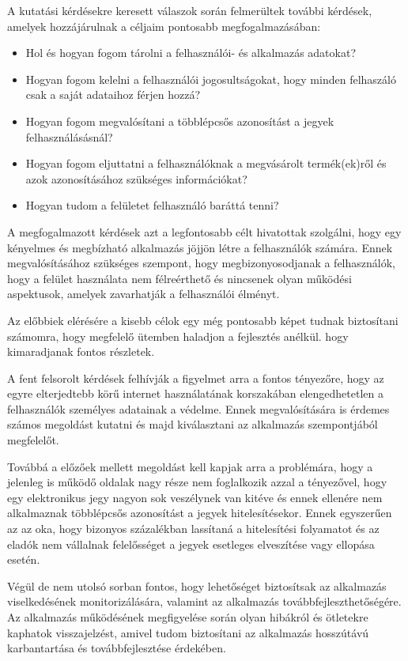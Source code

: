 A kutatási kérdésekre keresett válaszok során felmerültek további kérdések, amelyek hozzájárulnak a céljaim pontosabb megfogalmazásában:
\begin{itemize}
	\item Hol és hogyan fogom tárolni a felhasználói- és alkalmazás adatokat?
	\item Hogyan fogom kelelni a felhasználói jogosultságokat, hogy minden felhaszáló csak a saját adataihoz férjen hozzá?
	\item Hogyan fogom megvalósítani a többlépcsős azonosítást a jegyek felhasználásásnál?
	\item Hogyan fogom eljuttatni a felhasználóknak a megvásárolt termék(ek)ről és azok azonosításához szükséges információkat? 
	\item Hogyan tudom a felületet felhasználó baráttá tenni?
\end{itemize}

A megfogalmazott kérdések azt a legfontosabb célt hivatottak szolgálni, hogy egy kényelmes és megbízható alkalmazás jöjjön létre a felhasználók számára. Ennek megvalósításához szükséges szempont, hogy megbizonyosodjanak a felhasználók, hogy a felület használata nem félreérthető és nincsenek olyan működési aspektusok, amelyek zavarhatják a felhasználói élményt.

Az előbbiek elérésére a kisebb célok egy még pontosabb képet tudnak biztosítani számomra, hogy megfelelő ütemben haladjon a fejlesztés anélkül. hogy kimaradjanak fontos részletek.

A fent felsorolt kérdések felhívják a figyelmet arra a fontos tényezőre, hogy az egyre elterjedtebb körű internet használatának korszakában elengedhetetlen a felhasználók személyes adatainak a védelme. Ennek megvalósítására is érdemes számos megoldást kutatni és majd kiválasztani az alkalmazás szempontjából megfelelőt.

Továbbá a előzőek mellett megoldást kell kapjak arra a problémára, hogy a jelenleg is működő oldalak nagy része nem foglalkozik azzal a tényezővel, hogy egy elektronikus jegy nagyon sok veszélynek van kitéve és ennek ellenére nem alkalmaznak többlépcsős azonosítást a jegyek hitelesítésekor. Ennek egyszerűen az az oka, hogy bizonyos százalékban lassítaná a hitelesítési folyamatot és az eladók nem vállalnak felelősséget a jegyek esetleges elveszítése vagy ellopása esetén.

Végül de nem utolsó sorban fontos, hogy lehetőséget biztosítsak az alkalmazás viselkedésének monitorizálására, valamint az alkalmazás továbbfejleszthetőségére. Az alkalmazás működésének megfigyelése során olyan hibákról és ötletekre kaphatok visszajelzést, amivel tudom biztosítani az alkalmazás hosszútávú karbantartása és továbbfejlesztése érdekében.
